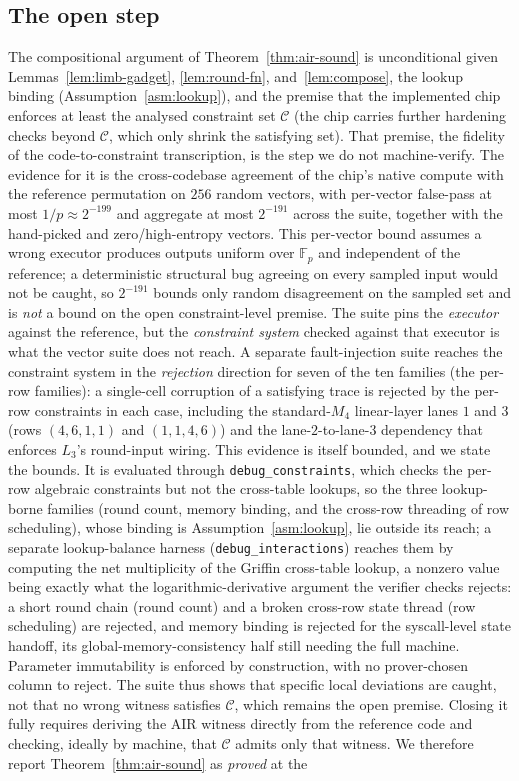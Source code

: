 \subsection{The open step}\label{app:status}
The compositional argument of Theorem~\ref{thm:air-sound} is unconditional given Lemmas~\ref{lem:limb-gadget}, \ref{lem:round-fn}, and~\ref{lem:compose}, the lookup binding (Assumption~\ref{asm:lookup}), and the premise that the implemented chip enforces at least the analysed constraint set $\mathcal{C}$ (the chip carries further hardening checks beyond $\mathcal{C}$, which only shrink the satisfying set). That premise, the fidelity of the code-to-constraint transcription, is the step we do not machine-verify. The evidence for it is the cross-codebase agreement of the chip's native compute with the reference permutation on $256$ random vectors, with per-vector false-pass at most $1/p\approx2^{-199}$ and aggregate at most $2^{-191}$ across the suite, together with the hand-picked and zero/high-entropy vectors. This per-vector bound assumes a wrong executor produces outputs uniform over $\mathbb{F}_p$ and independent of the reference; a deterministic structural bug agreeing on every sampled input would not be caught, so $2^{-191}$ bounds only random disagreement on the sampled set and is \emph{not} a bound on the open constraint-level premise. The suite pins the \emph{executor} against the reference, but the \emph{constraint system} checked against that executor is what the vector suite does not reach. A separate fault-injection suite reaches the constraint system in the \emph{rejection} direction for seven of the ten families (the per-row families): a single-cell corruption of a satisfying trace is rejected by the per-row constraints in each case, including the standard-$M_4$ linear-layer lanes $1$ and $3$ (rows $(4,6,1,1)$ and $(1,1,4,6)$) and the lane-$2$-to-lane-$3$ dependency that enforces $L_3$'s round-input wiring. This evidence is itself bounded, and we state the bounds. It is evaluated through \texttt{debug\_constraints}, which checks the per-row algebraic constraints but not the cross-table lookups, so the three lookup-borne families (round count, memory binding, and the cross-row threading of row scheduling), whose binding is Assumption~\ref{asm:lookup}, lie outside its reach; a separate lookup-balance harness (\texttt{debug\_interactions}) reaches them by computing the net multiplicity of the Griffin cross-table lookup, a nonzero value being exactly what the logarithmic-derivative argument the verifier checks rejects: a short round chain (round count) and a broken cross-row state thread (row scheduling) are rejected, and memory binding is rejected for the syscall-level state handoff, its global-memory-consistency half still needing the full machine. Parameter immutability is enforced by construction, with no prover-chosen column to reject. The suite thus shows that specific local deviations are caught, not that no wrong witness satisfies $\mathcal{C}$, which remains the open premise. Closing it fully requires deriving the AIR witness directly from the reference code and checking, ideally by machine, that $\mathcal{C}$ admits only that witness. We therefore report Theorem~\ref{thm:air-sound} as \emph{proved} at the 